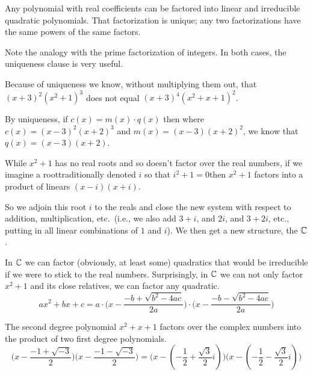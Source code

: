 \begin{corollary}
Any polynomial with real coefficients can be factored into linear and
irreducible quadratic polynomials.
That factorization is unique; any two factorizations have the same powers of
the same factors.
\end{corollary}

Note the analogy with the prime factorization of integers.
In both cases, the uniqueness clause is very useful.

\begin{example}
Because of uniqueness we know, without multiplying them out, that
\( (x+3)^2(x^2+1)^3 \) does not equal
\( (x+3)^4(x^2+x+1)^2 \).
\end{example}

\begin{example}
By uniqueness, if \( c(x)=m(x)\cdot q(x) \) then where
\( c(x)=(x-3)^2(x+2)^3 \) and \( m(x)=(x-3)(x+2)^2 \),
we know that \( q(x)=(x-3)(x+2) \).
\end{example}

While \( x^2+1 \) has no real roots and so doesn't factor over the real
numbers, if we imagine a root\Dash traditionally denoted \( i \) 
so that \( i^2+1=0 \)\Dash then \( x^2+1 \) factors into a product of linears 
\( (x-i)(x+i) \).

So we adjoin this root \( i \) to the reals and close the new system with
respect to addition, multiplication, etc.\ (i.e., we also add
\( 3+i \), and \( 2i \), and \( 3+2i \), etc., putting in all linear
combinations of $1$ and $i$).
We then get a new structure, the 
\( \mathbb{C} \).

In $\mathbb{C}$ we can factor (obviously, at least some) quadratics that would be
irreducible if we were to stick to the real numbers.
Surprisingly, in \( \mathbb{C} \) we can not only factor \( x^2+1 \)
and its close relatives, we can factor any quadratic.
\begin{equation*}
   ax^2+bx+c=
   a\cdot \big(x-\frac{-b+\sqrt{b^2-4ac}}{2a}\big)
    \cdot \big(x-\frac{-b-\sqrt{b^2-4ac}}{2a}\big)
\end{equation*}

\begin{example}
The second degree polynomial \( x^2+x+1 \) factors over the complex numbers 
into the product of two first degree polynomials.
\begin{equation*}
   \big(x-\frac{-1+\sqrt{-3}}{2}\big)
   \big(x-\frac{-1-\sqrt{-3}}{2}\big)
   =
   \big(x-(-\frac{1}{2}+\frac{\sqrt{3}}{2}i)\big)
   \big(x-(-\frac{1}{2}-\frac{\sqrt{3}}{2}i)\big)
\end{equation*}
\end{example}

